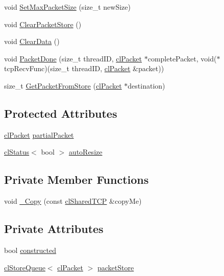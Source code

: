 \begin{DoxyCompactItemize}
\item 
void \hyperlink{classcl_shared_t_c_p_a199283f27a898d233746b4db6f72d6c3}{SetMaxPacketSize} (size\_\-t newSize)
\item 
void \hyperlink{classcl_shared_t_c_p_a6ba0e18bedcdad6989b8b583cd1479c9}{ClearPacketStore} ()
\item 
void \hyperlink{classcl_shared_t_c_p_a2d035977f40d63299b84c5ce1fc0c5d7}{ClearData} ()
\item 
void \hyperlink{classcl_shared_t_c_p_aa8cbe170e5162d5047947bd7ef231838}{PacketDone} (size\_\-t threadID, \hyperlink{classcl_packet}{clPacket} $\ast$completePacket, void($\ast$tcpRecvFunc)(size\_\-t threadID, \hyperlink{classcl_packet}{clPacket} \&packet))
\item 
size\_\-t \hyperlink{classcl_shared_t_c_p_aaecebc7d2783bef4309d75aaa22ba8e0}{GetPacketFromStore} (\hyperlink{classcl_packet}{clPacket} $\ast$destination)
\end{DoxyCompactItemize}
\subsection*{Protected Attributes}
\begin{DoxyCompactItemize}
\item 
\hyperlink{classcl_packet}{clPacket} \hyperlink{classcl_shared_t_c_p_a5bff66a18a60aa4260c87d1e3dbf9658}{partialPacket}
\item 
\hyperlink{classcl_status}{clStatus}$<$ bool $>$ \hyperlink{classcl_shared_t_c_p_aadfbe0c28871af737963ac9205a71a6c}{autoResize}
\end{DoxyCompactItemize}
\subsection*{Private Member Functions}
\begin{DoxyCompactItemize}
\item 
void \hyperlink{classcl_shared_t_c_p_ae07aa43b5b0ca2ae3947bfc90f17c2e6}{\_\-Copy} (const \hyperlink{classcl_shared_t_c_p}{clSharedTCP} \&copyMe)
\end{DoxyCompactItemize}
\subsection*{Private Attributes}
\begin{DoxyCompactItemize}
\item 
bool \hyperlink{classcl_shared_t_c_p_a2f584a19a4ba7d93b3a2e3467840c674}{constructed}
\item 
\hyperlink{classcl_store_queue}{clStoreQueue}$<$ \hyperlink{classcl_packet}{clPacket} $>$ \hyperlink{classcl_shared_t_c_p_a4f9fa934fb8217556dde5f5da38d76af}{packetStore}
\end{DoxyCompactItemize}


